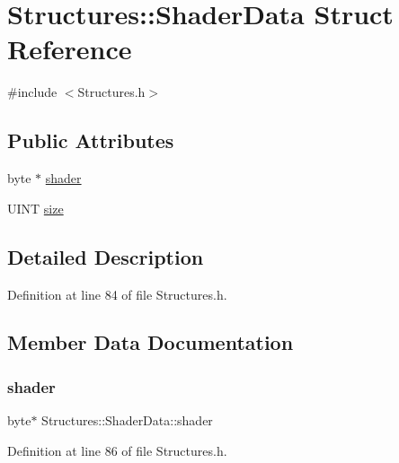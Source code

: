 \hypertarget{struct_structures_1_1_shader_data}{}\section{Structures\+:\+:Shader\+Data Struct Reference}
\label{struct_structures_1_1_shader_data}


{\ttfamily \#include $<$Structures.\+h$>$}

\subsection*{Public Attributes}
\begin{DoxyCompactItemize}
\item 
byte $\ast$ \mbox{\hyperlink{struct_structures_1_1_shader_data_a1a0c91d7cc06e0081ddf4693911d2721}{shader}}
\item 
U\+I\+NT \mbox{\hyperlink{struct_structures_1_1_shader_data_a0f54e401cae3304ffcbb317a6c0e12f7}{size}}
\end{DoxyCompactItemize}


\subsection{Detailed Description}


Definition at line 84 of file Structures.\+h.



\subsection{Member Data Documentation}
\mbox{\label{struct_structures_1_1_shader_data_a1a0c91d7cc06e0081ddf4693911d2721}} 
\subsubsection{\texorpdfstring{shader}{shader}}
{\footnotesize\ttfamily byte$\ast$ Structures\+::\+Shader\+Data\+::shader}



Definition at line 86 of file Structures.\+h.

\mbox{\label{struct_structures_1_1_shader_data_a0f54e401cae3304ffcbb317a6c0e12f7}} 
